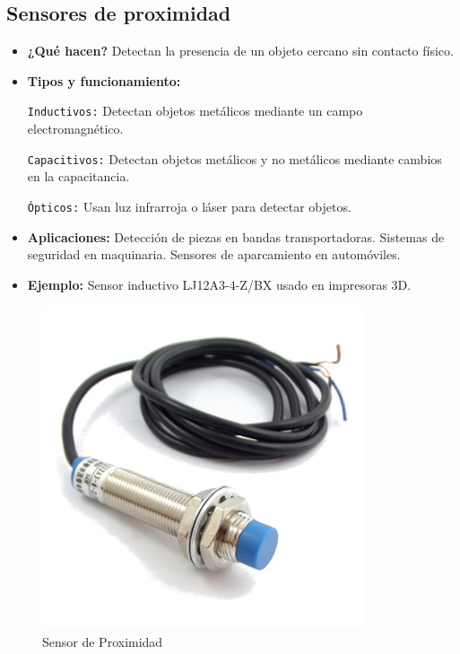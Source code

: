 \subsection*{Sensores de proximidad}
\begin{itemize}
	\item \textbf{¿Qué hacen?} Detectan la presencia de un objeto cercano sin contacto físico.
	\item \textbf{Tipos y funcionamiento:}
	
	\texttt{Inductivos:} Detectan objetos metálicos mediante un campo electromagnético.
	
	\texttt{Capacitivos:} Detectan objetos metálicos y no metálicos mediante cambios en la capacitancia.
	
	\texttt{Ópticos:} Usan luz infrarroja o láser para detectar objetos.
	\item \textbf{Aplicaciones:} Detección de piezas en bandas transportadoras.
	Sistemas de seguridad en maquinaria.
	Sensores de aparcamiento en automóviles.
	\item \textbf{Ejemplo:} Sensor inductivo LJ12A3-4-Z/BX usado en impresoras 3D.
	\cite{universalrobots_sensores_robótica}
	\cite{robotnik_sensores_2023}
\end{itemize}
\begin{figure}[h]
	\centering
	\includegraphics[width=0.3\linewidth]{img/sensor de proximidad}
	\caption{Sensor de Proximidad}
	\label{fig:sensor de proximidad}
\end{figure}


